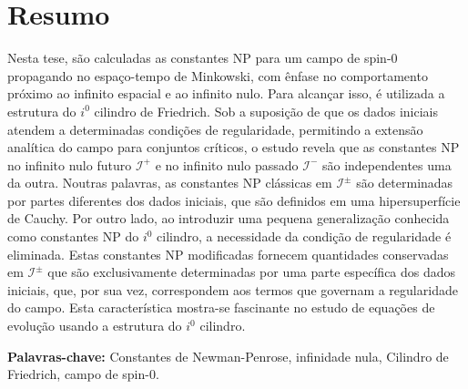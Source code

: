 
\section*{Resumo}


Nesta tese, são calculadas as constantes NP para um campo de spin-0 propagando no espaço-tempo de Minkowski, com ênfase no comportamento próximo ao infinito espacial e ao infinito nulo. Para alcançar isso, é utilizada a estrutura do $i^0$ cilindro de Friedrich. Sob a suposição de que os dados iniciais atendem a determinadas condições de regularidade, permitindo a extensão analítica do campo para conjuntos críticos, o estudo revela que as constantes NP no infinito nulo futuro $\mathscr{I}^{+}$ e no infinito nulo passado $\mathscr{I}^{-}$ são independentes uma da outra. Noutras palavras, as constantes NP clássicas em $\mathscr{I}^{\pm}$ são determinadas por partes diferentes dos dados iniciais, que são definidos em uma hipersuperfície de Cauchy.
Por outro lado, ao introduzir uma pequena generalização conhecida como constantes NP do $i^0$ cilindro, a necessidade da condição de regularidade é eliminada. Estas constantes NP modificadas fornecem quantidades conservadas em $\mathscr{I}^{\pm}$ que são exclusivamente determinadas por uma parte específica dos dados iniciais, que, por sua vez, correspondem aos termos que governam a regularidade do campo. Esta característica mostra-se fascinante no estudo de equações de evolução usando a estrutura do $i^0$ cilindro.

\vfill

\textbf{\Large Palavras-chave:} Constantes de Newman-Penrose, infinidade nula, Cilindro de Friedrich, campo de spin-0.

